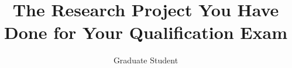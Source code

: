 \documentclass[12pt]{ruthesis}
\title{The Research Project You Have Done for Your Qualification Exam}
\author{Graduate Student}
\begin{document}
  \begin{frontmatter}
   \maketitle
   \tableofcontents
  \end{frontmatter}






\printbibliography
\end{document}

